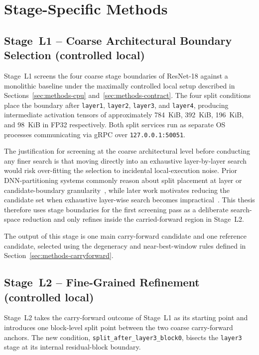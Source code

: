 \section{Stage-Specific Methods}
\label{sec:methods-stages}

\subsection{Stage~L1 -- Coarse Architectural Boundary Selection (controlled local)}
\label{sec:methods-rq11}

Stage~L1 screens the four coarse stage boundaries of ResNet-18 against a monolithic
baseline under the maximally controlled local setup described in
Sections~\ref{sec:methods-cpu} and~\ref{sec:methods-contract}.
The four split conditions place the boundary after \texttt{layer1}, \texttt{layer2},
\texttt{layer3}, and \texttt{layer4}, producing intermediate activation tensors of
approximately 784~KiB, 392~KiB, 196~KiB, and 98~KiB in FP32 respectively.
Both split services run as separate OS processes communicating via gRPC over
\texttt{127.0.0.1:50051}.

The justification for screening at the coarse architectural level before conducting
any finer search is that moving directly into an exhaustive layer-by-layer search would
risk over-fitting the selection to incidental local-execution noise.
Prior DNN-partitioning systems commonly reason about split placement at layer or
candidate-boundary granularity~\cite{neurosurgeon,dnnsplit}, while later work motivates
reducing the candidate set when exhaustive layer-wise search becomes
impractical~\cite{dnnsplit,pareto_split,survey_partitioning}.
This thesis therefore uses stage boundaries for the first screening pass as a deliberate
search-space reduction and only refines inside the carried-forward region in Stage~L2.

The output of this stage is one main carry-forward candidate and one reference
candidate, selected using the degeneracy and near-best-window rules defined in
Section~\ref{sec:methods-carryforward}.

\subsection{Stage~L2 -- Fine-Grained Refinement (controlled local)}
\label{sec:methods-rq12}

Stage~L2 takes the carry-forward outcome of Stage~L1 as its starting point and introduces one
block-level split point between the two coarse carry-forward anchors.
The new condition, \texttt{split\_after\_layer3\_block0}, bisects the \texttt{layer3}
stage at its internal residual-block boundary.

